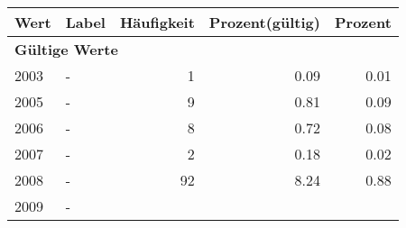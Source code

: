      \begin{longtable}{lXrrr}
     \toprule
     \textbf{Wert} & \textbf{Label} & \textbf{Häufigkeit} & \textbf{Prozent(gültig)} & \textbf{Prozent} \\
     \endhead
     \midrule
     \multicolumn{5}{l}{\textbf{Gültige Werte}}\\

     2003 &
     \multicolumn{1}{X}{ -  } &


       \num{1} &
       \num[round-mode=places,round-precision=2]{0.09} &
         \num[round-mode=places,round-precision=2]{0.01} \\

     2005 &
     \multicolumn{1}{X}{ -  } &


       \num{9} &
       \num[round-mode=places,round-precision=2]{0.81} &
         \num[round-mode=places,round-precision=2]{0.09} \\

     2006 &
     \multicolumn{1}{X}{ -  } &


       \num{8} &
       \num[round-mode=places,round-precision=2]{0.72} &
         \num[round-mode=places,round-precision=2]{0.08} \\

     2007 &
     \multicolumn{1}{X}{ -  } &


       \num{2} &
       \num[round-mode=places,round-precision=2]{0.18} &
         \num[round-mode=places,round-precision=2]{0.02} \\

     2008 &
     \multicolumn{1}{X}{ -  } &


       \num{92} &
       \num[round-mode=places,round-precision=2]{8.24} &
         \num[round-mode=places,round-precision=2]{0.88} \\

     2009 &
     \multicolumn{1}{X}{ -  } &



\end{longtable}
